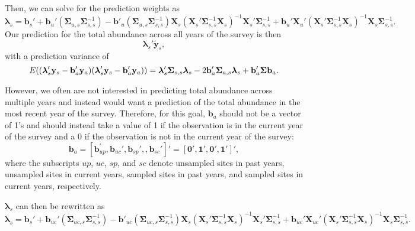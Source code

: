 \documentclass[]{interact}
\theoremstyle{plain}%
\theoremstyle{definition}
\theoremstyle{remark}
\begin{document}
Then, we can solve for the prediction weights as \mbox{}
\begin{equation}
\bm{\lambda}_s = \mathbf{b}_{s}' + \mathbf{b}_{u}' (\bm{\Sigma}_{u, s}\bm{\Sigma}_{s, s}^{-1}) - \mathbf{b}'_{u}(\bm{\Sigma}_{u, s} \bm{\Sigma}_{s, s}^{-1})\mathbf{X}_s(\mathbf{X}_s'\bm{\Sigma}_{s, s}^{-1}\mathbf{X}_s)^{-1}\mathbf{X}_s'\bm{\Sigma}_{s, s}^{-1} + \mathbf{b}_{u}' \mathbf{X}_{u}'(\mathbf{X}_s'\bm{\Sigma}_{s, s}^{-1}\mathbf{X}_s)^{-1}\mathbf{X}_s \bm{\Sigma}_{s, s}^{-1}.
\end{equation} \noindent Our prediction for the total abundance across
all years of the survey is then \mbox{} \begin{equation}
\bm{\lambda}_s' \mathbf{\tilde{y}}_s,
\end{equation} \noindent with a prediction variance of \mbox{}
\begin{equation}
E((\bm{\lambda}_s'\mathbf{y}_s - \mathbf{b}_a'\mathbf{y}_a)(\bm{\lambda}_s'\mathbf{y}_s - \mathbf{b}_a'\mathbf{y}_a)) = \\
\bm{\lambda}_s'\bm{\Sigma}_{s, s}\bm{\lambda}_s - 2 \mathbf{b}_a' \bm{\Sigma}_{a ,s} \bm{\lambda}_s + \mathbf{b}_a' \bm{\Sigma}\mathbf{b}_a.
\end{equation}

However, we often are not interested in predicting total abundance
across multiple years and instead would want a prediction of the total
abundance in the most recent year of the survey. Therefore, for this
goal, \(\mathbf{b}_a\) should not be a vector of 1's and should instead
take a value of 1 if the observation is in the current year of the
survey and a 0 if the observation is not in the current year of the
survey: \mbox{} \begin{equation}
\mathbf{b}_a = [\mathbf{b}_{up}^\prime, \mathbf{b}_{uc}', \mathbf{b}_{sp}', , \mathbf{b}_{sc}']' = [\mathbf{0}', \mathbf{1}', \mathbf{0}', \mathbf{1}']',
\end{equation} \noindent where the subscripts \(up\), \(uc\), \(sp\),
and \(sc\) denote unsampled sites in past years, unsampled sites in
current years, sampled sites in past years, and sampled sites in current
years, respectively.

\(\bm{\lambda}_s\) can then be rewritten as \mbox{} \begin{equation}
\bm{\lambda}_s = \mathbf{b}_{s}' + \mathbf{b}_{uc}' (\bm{\Sigma}_{uc, s}\bm{\Sigma}_{s, s}^{-1}) - \mathbf{b}'_{uc}(\bm{\Sigma}_{uc, s} \bm{\Sigma}_{s, s}^{-1})\mathbf{X}_s(\mathbf{X}_s'\bm{\Sigma}_{s, s}^{-1}\mathbf{X}_s)^{-1}\mathbf{X}_s'\bm{\Sigma}_{s, s}^{-1} + \mathbf{b}_{uc}' \mathbf{X}_{uc}'(\mathbf{X}_s'\bm{\Sigma}_{s, s}^{-1}\mathbf{X}_s)^{-1}\mathbf{X}_s \bm{\Sigma}_{s, s}^{-1}.
\end{equation}
\end{document}
